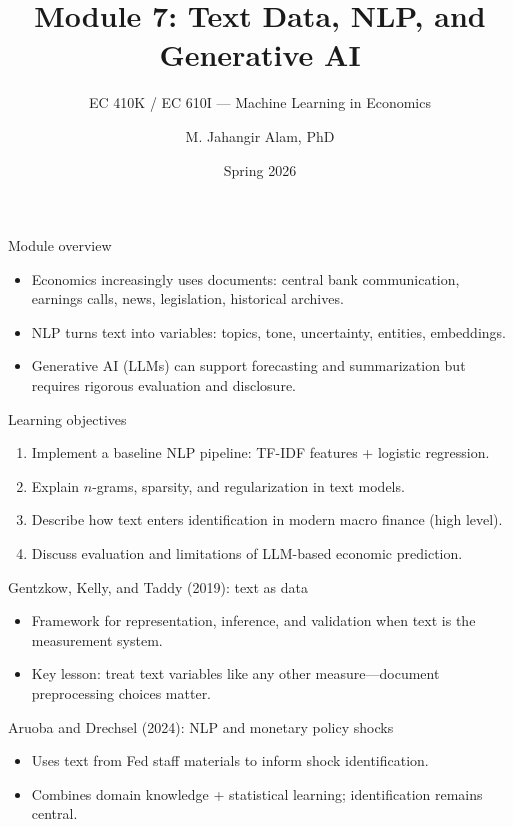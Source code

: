 \documentclass[aspectratio=169,11pt]{beamer}
\title[Text \& NLP]{Module 7: Text Data, NLP, and Generative AI}
\subtitle{EC 410K / EC 610I --- Machine Learning in Economics}
\author{M. Jahangir Alam, PhD}
\institute{Wilfrid Laurier University}
\date{Spring 2026}
\begin{document}
\begin{frame}[plain]
  \titlepage
\end{frame}

\begin{frame}{Module overview}
  \begin{itemize}
    \item Economics increasingly uses documents: central bank communication, earnings calls, news, legislation, historical archives.
    \item NLP turns text into variables: topics, tone, uncertainty, entities, embeddings.
    \item Generative AI (LLMs) can support forecasting and summarization but requires rigorous evaluation and disclosure.
  \end{itemize}
\end{frame}

\begin{frame}{Learning objectives}
  \begin{enumerate}
    \item Implement a baseline NLP pipeline: TF-IDF features + logistic regression.
    \item Explain \(n\)-grams, sparsity, and regularization in text models.
    \item Describe how text enters identification in modern macro finance (high level).
    \item Discuss evaluation and limitations of LLM-based economic prediction.
  \end{enumerate}
\end{frame}

\begin{frame}{Gentzkow, Kelly, and Taddy (2019): text as data}
  \begin{itemize}
    \item Framework for representation, inference, and validation when text is the measurement system.
    \item Key lesson: treat text variables like any other measure---document preprocessing choices matter.
  \end{itemize}
\end{frame}

\begin{frame}{Aruoba and Drechsel (2024): NLP and monetary policy shocks}
  \begin{itemize}
    \item Uses text from Fed staff materials to inform shock identification.
    \item Combines domain knowledge + statistical learning; identification remains central.
  \end{itemize}
\end{frame}
\end{document}
